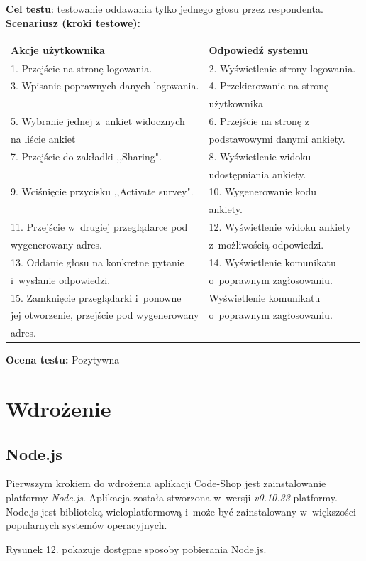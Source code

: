 \documentclass[12pt,a4paper,notitlepage]{article}
\begin{document}
\textbf{Cel testu}: testowanie oddawania tylko jednego głosu przez respondenta. \\
\textbf{Scenariusz (kroki testowe):}
\begin{center}
  \begin{tabular}{| l| l|}
    \hline
    
 \textbf{Akcje użytkownika} &  \textbf{Odpowiedź systemu} \\  \hline
1. Przejście na stronę logowania. & 2. Wyświetlenie strony logowania. \\ 
3. Wpisanie poprawnych danych logowania. & 4. Przekierowanie na stronę  \\ 
& użytkownika \\ 
5. Wybranie jednej z~ankiet widocznych & 6. Przejście na stronę z~ \\  na liście ankiet &  podstawowymi danymi ankiety. \\
7. Przejście do zakładki ,,Sharing". & 8. Wyświetlenie widoku  \\ & udostępniania ankiety. \\
9. Wciśnięcie przycisku ,,Activate survey". & 10. Wygenerowanie kodu \\ & ankiety. \\
11. Przejście w~drugiej przeglądarce pod & 12. Wyświetlenie widoku ankiety  \\  wygenerowany adres. & z~możliwością odpowiedzi. \\
13. Oddanie głosu na konkretne pytanie & 14. Wyświetlenie komunikatu \\  i~wysłanie odpowiedzi. &  o~poprawnym zagłosowaniu. \\
15. Zamknięcie przeglądarki i~ponowne & Wyświetlenie komunikatu  \\  jej otworzenie, przejście pod wygenerowany & o~poprawnym zagłosowaniu. \\  adres. & \\
\hline
 
  \end{tabular}
\end{center}

\textbf{Ocena testu: } Pozytywna

\newpage
\section {Wdrożenie}

\subsection{Node.js}
Pierwszym krokiem do wdrożenia aplikacji Code-Shop jest zainstalowanie platformy \textit{Node.js}. Aplikacja została stworzona w~wersji \textit{v0.10.33} platformy. Node.js jest biblioteką wieloplatformową i~może być zainstalowany w~większości popularnych systemów operacyjnych.
\par Rysunek 12. pokazuje dostępne sposoby pobierania Node.js.
\end{document}
